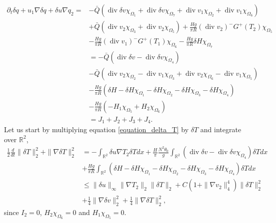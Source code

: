 \documentclass[11pt, a4paper, article,reqno,]{amsart}
\theoremstyle{remark}
\DeclareMathOperator{\dive}{div}
\numberwithin{equation}{section}
\begin{document}
\begin{equation}\label{equation_delta_q}
    \begin{aligned}
        \partial_t \delta q + u_1 \nabla \delta q + \delta u \nabla q_2  = & - \bar{Q}(\dive \delta v \chi_{\Omega_1}   + \dive \delta v \chi_{\Omega_7}+ \dive v_1 \chi_{\Omega_2} + \dive v_1 \chi_{\Omega_6})\\ 
        & + \bar{Q}(\dive v_2 \chi_{\Omega_3} + \dive v_2 \chi_{\Omega_5} )+ \frac{Hg}{\pi R}(\dive v_2)^-G^+(T_2) \chi_{\Omega_5} \\
        &- \frac{Hg}{\pi R}(\dive v_1)^-G^+(T_1)  \chi_{\Omega_6} - \frac{Hg}{\pi R} \delta H\chi_{\Omega_7}\\
        & = - \bar Q (\dive \delta v - \dive \delta v \chi_{\Omega_4}) \\
        & - \bar Q (  \dive v_2  \chi_{\Omega_2} - \dive v_1 \chi_{\Omega_3} + \dive v_2 \chi_{\Omega_6}  - \dive v_1 \chi_{\Omega_5})  \\
        & - \frac{Hg}{\pi R}(\delta H -  \delta H\chi_{\Omega_1} - \delta H\chi_{\Omega_2} - \delta H\chi_{\Omega_3}- \delta H\chi_{\Omega_4})\\
        & - \frac{Hg}{\pi R}( - H_1\chi_{\Omega_5} + H_2\chi_{\Omega_6}) \\
        &= J_1 + J_2 + J_3 + J_4.
    \end{aligned}
\end{equation}
Let us start by multiplying equation \eqref{equation_delta_T} by $\delta T$ and integrate over $\mathbb{R}^2$,
\begin{equation}\label{eq_T_final}
    \begin{aligned}
        \frac{1}{2}\frac{d}{dt} \|\delta T\|_2^2+ \|\nabla \delta T\|_2^2 & = - \int_{\mathbb{R}^2} \delta u \nabla T_2 \delta T dx + \frac{H}{\pi}\frac{N^2 \theta_0}{g} \int_{\mathbb{R}^2} (\dive \delta v - \dive \delta v \chi_{\Omega_4})\delta Tdx \\
        & + \frac{Hg}{\pi R} \int_{\mathbb{R}^2}(\delta H -  \delta H\chi_{\Omega_1} - \delta H\chi_{\Omega_2} - \delta H\chi_{\Omega_3}- \delta H\chi_{\Omega_4})\delta T dx\\
        & \leq \|\delta u\|_\infty \|\nabla T_2\|_2 \|\delta T\|_2  + C(1 + \|\nabla v_2\|_4^4)\|\delta T\|_2^2 \\
        & + \frac{1}{4} \|\nabla \delta v\|_2^2 + \frac{1}{4}\|\nabla \delta T \|_2^2, 
    \end{aligned}
\end{equation}
since $I_2 = 0$, $H_2\chi_{\Omega_6}=0$ and $H_1\chi_{\Omega_5} = 0$. 
\end{document}
